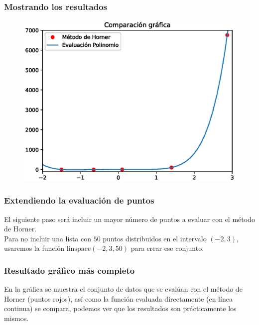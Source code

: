 \documentclass[12pt]{beamer}
\begin{document}
\begin{frame}[fragile]
\frametitle{Mostrando los resultados}
\begin{figure}
	\centering
	\includegraphics[scale=0.55]{Imagenes/MetodoHorner_01.eps}
\end{figure}
\end{frame}
\begin{frame}[fragile]
\frametitle{Extendiendo la evaluación de puntos}
El siguiente paso será incluir un mayor número de puntos a evaluar con el método de Horner.
\\
\bigskip
\pause
Para no incluir una lista con $50$ puntos distribuidos en el intervalo $(-2, 3)$, usaremos la función $\mbox{linspace}(-2, 3, 50)$ para crear ese conjunto.
\end{frame}
\begin{frame}[fragile]
\frametitle{Resultado gráfico más completo}
En la gráfica se muestra el conjunto de datos que se evalúan con el método de Horner (puntos rojos), así como la función evaluada directamente (en línea continua) se compara, podemos ver que los resultados son prácticamente los mismos.
\end{frame}
\end{document}
